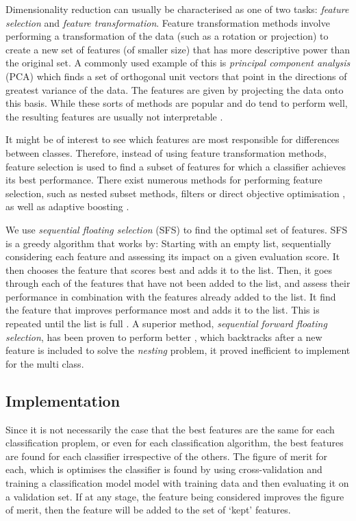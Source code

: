 Dimensionality reduction can usually be characterised as one of two tasks: \textit{feature selection} and \textit{feature transformation}. Feature transformation methods involve performing a transformation of the data (such as a rotation or projection) to create a new set of features (of smaller size) that has more descriptive power than the original set. A commonly used example of this is \textit{principal component analysis} (PCA) which finds a set of orthogonal unit vectors that point in the directions of greatest variance of the data. The features are given by projecting the data onto this basis. While these sorts of methods are popular and do tend to perform well, the resulting features are usually not interpretable \cite{Guyon}. 

It might be of interest to see which features are most responsible for differences between classes. Therefore, instead of using feature transformation methods, feature selection is used to find a subset of features for which a classifier achieves its best performance. There exist numerous methods for performing feature selection, such as nested subset methods, filters or direct objective optimisation \cite{Guyon}, as well as adaptive boosting \cite{Wang_2}.

We use \textit{sequential floating selection} (SFS) \cite{Somol} to find the optimal set of features. SFS is a greedy algorithm that works by: Starting with an empty list, sequentially considering each feature and assessing its impact on a given evaluation score. It then chooses the feature that scores best and adds it to the list. Then, it goes through each of the features that have not been added to the list, and assess their performance in combination with the features already added to the list. It find the feature that improves performance most and adds it to the list. This is repeated until the list is full \cite{Juha}. A superior method, \textit{sequential forward floating selection}, has been proven to perform better \cite{Somol}, which backtracks after a new feature is included to solve the \textit{nesting} problem, it proved inefficient to implement for the multi class.

\subsection{Implementation}
Since it is not necessarily the case that the best features are the same for each classification proplem, or even for each classification algorithm, the best features are found for each classifier irrespective of the others. The figure of merit for each, which is optimises the classifier is found by using cross-validation and training a classification model model with training data and then evaluating it on a validation set. If at any stage, the feature being considered improves the figure of merit, then the feature will be added to the set of `kept' features.

